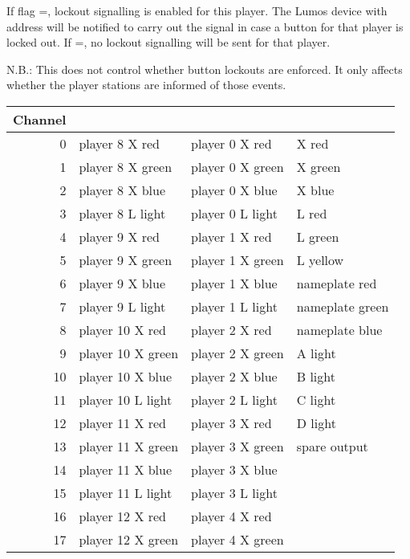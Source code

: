 \documentclass[letterpaper,twoside,onecolumn,openright,final]{memoir}
\begin{document}
\begin{QS}
	If flag =, lockout signalling is enabled for this player. The Lumos device
	with address  will be notified to carry out the signal in case a button
	for that player is locked out. If =, no lockout signalling will be sent
	for that player.

	N.B.: This does not control whether button lockouts are enforced. It only affects
	whether the player stations are informed of those events.

\begin{table}
	\begin{QS*}
		\begin{center}
			\begin{tabular}{rlll}\\\toprule
				\bfseries Channel &
				\bfseries \acronym{QSMC} &
				\bfseries \acronym{QSXT} &
				\bfseries \acronym{QSCC} \\\midrule
				0 & player 8 X red  & player 0 X red & X red \\
				1 & player 8 X green  & player 0 X green & X green \\
				2 & player 8 X blue  & player 0 X blue & X blue \\
				3 & player 8 L light  & player 0 L light & L red \\
				4 & player 9 X red  & player 1 X red & L green \\
				5 & player 9 X green  & player 1 X green & L yellow \\
				6 & player 9 X blue  & player 1 X blue & nameplate red \\
				7 & player 9 L light  & player 1 L light & nameplate green \\
				8 & player 10 X red  & player 2 X red & nameplate blue \\
				9 & player 10 X green  & player 2 X green & A light \\
				10& player 10 X blue  & player 2 X blue & B light \\
				11& player 10 L light  & player 2 L light & C light \\
				12& player 11 X red  & player 3 X red & D light \\
				13& player 11 X green  & player 3 X green & spare output \\
				14& player 11 X blue  & player 3 X blue \\
				15& player 11 L light  & player 3 L light \\
				16& player 12 X red  & player 4 X red \\
				17& player 12 X green  & player 4 X green \\

\end{tabular}
\end{center}
\end{QS*}
\end{table}
\end{QS}
\end{document}
